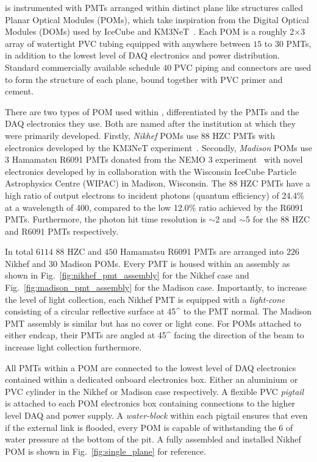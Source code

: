 \chipsfive is instrumented with PMTs arranged within distinct plane like structures called Planar
Optical Modules (POMs), which take inspiration from the Digital Optical Modules (DOMs) used by
IceCube and KM3NeT~\cite{hanson2006, eijk2015}. Each POM is a roughly
\unit{2}{}$\times$\unit{3}{} array of watertight PVC tubing equipped with
anywhere between $15$ to $30$ PMTs, in addition to the lowest level of DAQ electronics and power
distribution. Standard commercially available schedule $40$ PVC piping and connectors are used to
form the structure of each plane, bound together with PVC primer and cement.

There are two types of POM used within \chipsfive, differentiated by the PMTs and the DAQ
electronics they use. Both are named after the institution at which they were primarily developed.
Firstly, \emph{Nikhef} POMs use \unit{88}{} HZC PMTs with electronics developed by the
KM3NeT experiment~\cite{katz2009, adrian2016}. Secondly, \emph{Madison} POMs use
\unit{3}{} Hamamatsu R6091 PMTs donated from the NEMO 3 experiment~\cite{arnold2005}
with novel electronics developed by \chips in collaboration with the Wisconsin IceCube Particle
Astrophysics Centre (WIPAC) in Madison, Wisconsin. The \unit{88}{} HZC PMTs have a high
ratio of output electrons to incident photons (quantum efficiency) of 24.4\% at a wavelength of
\unit{400}{}, compared to the low 12.0\% ratio achieved by the R6091 PMTs. Furthermore,
the photon hit time resolution is $\sim$\unit{2}{} and $\sim$\unit{5}{} for
the \unit{88}{} HZC and R6091 PMTs respectively.

In total $6114$ \unit{88}{} HZC and $450$ Hamamatsu R6091 PMTs are arranged into $226$
Nikhef and $30$ Madison POMs. Every PMT is housed within an assembly as shown in
Fig.~\ref{fig:nikhef_pmt_assembly} for the Nikhef case and Fig.~\ref{fig:madison_pmt_assembly} for
the Madison case. Importantly, to increase the level of light collection, each Nikhef PMT is
equipped with a \emph{light-cone} consisting of a circular reflective surface at \unit{45}{^\circ}
to the PMT normal. The Madison PMT assembly is similar but has no cover or light cone. For POMs
attached to either endcap, their PMTs are angled at \unit{45}{^\circ} facing the direction of the
beam to increase light collection furthermore.

All PMTs within a POM are connected to the lowest level of DAQ electronics contained within a
dedicated onboard electronics box. Either an aluminium or PVC cylinder in the Nikhef or Madison
case respectively. A flexible PVC \emph{pigtail} is attached to each POM electronics box
containing connections to the higher level DAQ and power supply. A \emph{water-block} within each
pigtail ensures that even if the external link is flooded, every POM is capable of withstanding
the \unit{6}{} of water pressure at the bottom of the pit. A fully assembled and
installed Nikhef POM is shown in Fig.~\ref{fig:single_plane} for reference.

